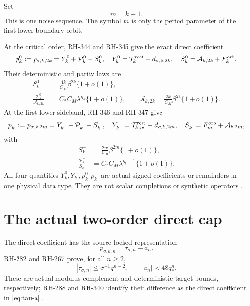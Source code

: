 \documentclass[11pt]{article}
\theoremstyle{remark}
\newcommand{\cP}{\mathcal P}
\newcommand{\cA}{\mathcal A}
\newcommand{\cT}{\mathcal T}
\begin{document}
Set
\begin{equation}\label{eq:m}
 m=k-1.
\end{equation}
This is one noise sequence.  The symbol $m$ is only the period parameter of
the first-lower boundary orbit.

At the critical order, RH-344 and RH-345 give the exact direct coefficient
\begin{equation}\label{eq:critical}
 p_k^0:=p_{\sigma,k,2k}
 =Y_k^0+\cP_k^0-S_k^0,
 \quad
 Y_k^0=\cT_k^{\rm rest}-d_{\sigma,k,2k},
 \quad
 S_k^0=\cA_{k,2k}+F_k^{\rm orb}.
\end{equation}
Their deterministic and parity laws are
\begin{align}
 S_k^0&=\frac{4k}{C_M}\beta^{2k}\{1+o(1)\},
 \label{eq:critical-S}\\
 \frac{\cP_k^0}{\cA_{k,2k}}
 &=C_*C_M\lambda^{\eta_k}\{1+o(1)\},
 \qquad
 \cA_{k,2k}=\frac{2k}{C_M}\beta^{2k}\{1+o(1)\}.
 \label{eq:critical-P}
\end{align}
At the first lower sideband, RH-346 and RH-347 give
\begin{equation}\label{eq:lower}
 p_k^-:=p_{\sigma,k,2m}
 =Y_k^-+\cP_k^--S_k^-,
 \quad
 Y_k^-=\cT_{k,m}^{\rm rest}-d_{\sigma,k,2m},
 \quad
 S_k^-=F_m^{\rm orb}+\cA_{k,2m},
\end{equation}
with
\begin{align}
 S_k^-&=\frac{2m}{C_M}\beta^{2m}\{1+o(1)\},
 \label{eq:lower-S}\\
 \frac{\cP_k^-}{S_k^-}
 &=C_*C_M\lambda^{\eta_k-1}\{1+o(1)\}.
 \label{eq:lower-P}
\end{align}
All four quantities $Y_k^0,Y_k^-,p_k^0,p_k^-$ are actual signed
coefficients or remainders in one physical data type.  They are not scalar
completions or synthetic operators
\citep{WangCompleteCritical2026,WangCriticalBalance2026,
WangCompleteLower2026,WangLowerBalance2026}.

\section{The actual two-order direct cap}

The direct coefficient has the source-locked representation
\begin{equation}\label{eq:tau-a}
 p_{\sigma,k,n}=\tau_{\sigma,n}-a_n.
\end{equation}
RH-282 and RH-267 prove, for all $n\ge2$,
\begin{equation}\label{eq:source-caps}
 |\tau_{\sigma,n}|\le\sigma^{-1}q^{n-2},
 \qquad |a_n|<48q_*^n.
\end{equation}
These are actual modulus-complement and deterministic-target bounds,
respectively; RH-288 and RH-340 identify their difference as the direct
coefficient in \eqref{eq:tau-a}
\citep{WangSpectralTail2026,WangUnifiedEnvelope2026,WangGluing2026,
WangSynchronization2026,WangModulusCancellation2026}.
\end{document}
